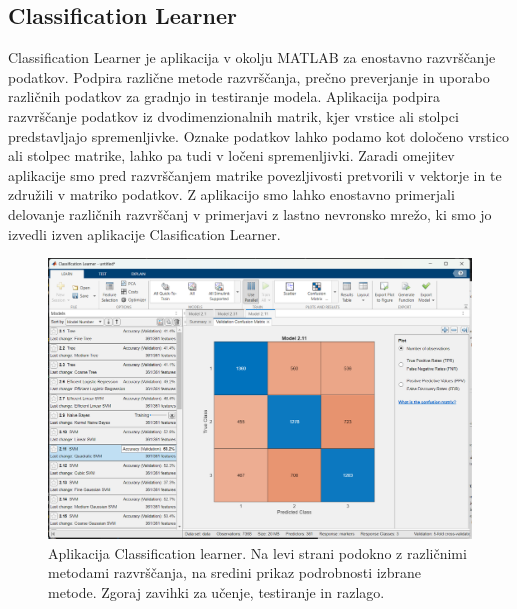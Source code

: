 \subsection{Classification Learner}
Classification Learner je aplikacija v okolju MATLAB za enostavno razvrščanje podatkov. Podpira različne metode razvrščanja, prečno preverjanje in uporabo različnih podatkov za gradnjo in testiranje modela. Aplikacija podpira razvrščanje podatkov iz dvodimenzionalnih matrik, kjer vrstice ali stolpci predstavljajo spremenljivke. Oznake podatkov lahko podamo kot določeno vrstico ali stolpec matrike, lahko pa tudi v ločeni spremenljivki. Zaradi omejitev aplikacije smo pred razvrščanjem matrike povezljivosti pretvorili v vektorje in te združili v matriko podatkov. Z aplikacijo smo lahko enostavno primerjali delovanje različnih razvrščanj v primerjavi z lastno nevronsko mrežo, ki smo jo izvedli izven aplikacije Clasification Learner.
\begin{figure}[h!]
    \begin{center}
    \includegraphics[width=1\linewidth]{slike/ClasificationLearner.png}
    \end{center}
    \caption[Aplikacija Classification learner.]{Aplikacija Classification learner. Na levi strani podokno z različnimi metodami razvrščanja, na sredini prikaz podrobnosti izbrane metode. Zgoraj zavihki za učenje, testiranje in razlago. }
    \end{figure}

